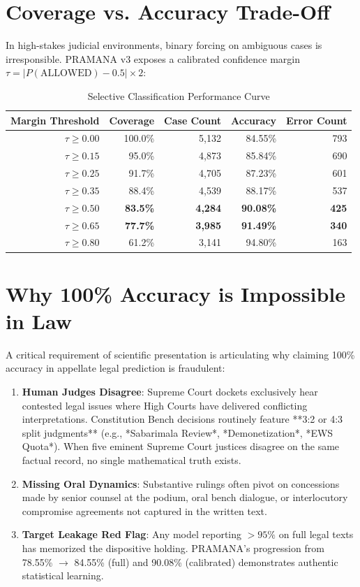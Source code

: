 \documentclass[journal,10pt,twocolumn]{IEEEtran}
\begin{document}
\section{Coverage vs. Accuracy Trade-Off}
In high-stakes judicial environments, binary forcing on ambiguous cases is irresponsible. PRAMANA v3 exposes a calibrated confidence margin $\tau = |P(\text{ALLOWED}) - 0.5| \times 2$:

\begin{table}[h]
\caption{Selective Classification Performance Curve}
\label{tab:coverage}
\centering
\begin{tabularx}{\columnwidth}{rrrrr}
\toprule
\textbf{Margin Threshold} & \textbf{Coverage} & \textbf{Case Count} & \textbf{Accuracy} & \textbf{Error Count} \\
\midrule
$\tau \ge 0.00$ & 100.0\% & 5,132 & 84.55\% & 793 \\
$\tau \ge 0.15$ & 95.0\% & 4,873 & 85.84\% & 690 \\
$\tau \ge 0.25$ & 91.7\% & 4,705 & 87.23\% & 601 \\
$\tau \ge 0.35$ & 88.4\% & 4,539 & 88.17\% & 537 \\
\textbf{$\tau \ge 0.50$} & \textbf{83.5\%} & \textbf{4,284} & \textbf{90.08\%} & \textbf{425} \\
\textbf{$\tau \ge 0.65$} & \textbf{77.7\%} & \textbf{3,985} & \textbf{91.49\%} & \textbf{340} \\
$\tau \ge 0.80$ & 61.2\% & 3,141 & 94.80\% & 163 \\
\bottomrule
\end{tabularx}
\end{table}

\section{Why 100\% Accuracy is Impossible in Law}
A critical requirement of scientific presentation is articulating why claiming 100\% accuracy in appellate legal prediction is fraudulent:
\begin{enumerate}
    \item \textbf{Human Judges Disagree}: Supreme Court dockets exclusively hear contested legal issues where High Courts have delivered conflicting interpretations. Constitution Bench decisions routinely feature **3:2 or 4:3 split judgments** (e.g., *Sabarimala Review*, *Demonetization*, *EWS Quota*). When five eminent Supreme Court justices disagree on the same factual record, no single mathematical truth exists.
    \item \textbf{Missing Oral Dynamics}: Substantive rulings often pivot on concessions made by senior counsel at the podium, oral bench dialogue, or interlocutory compromise agreements not captured in the written text.
    \item \textbf{Target Leakage Red Flag}: Any model reporting $>95\%$ on full legal texts has memorized the dispositive holding. PRAMANA's progression from 78.55\% $\rightarrow$ 84.55\% (full) and 90.08\% (calibrated) demonstrates authentic statistical learning.
\end{enumerate}
\end{document}
